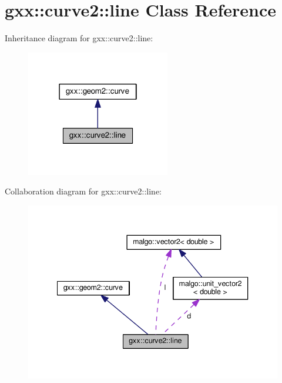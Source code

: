 \hypertarget{classgxx_1_1curve2_1_1line}{}\section{gxx\+:\+:curve2\+:\+:line Class Reference}
\label{classgxx_1_1curve2_1_1line}


Inheritance diagram for gxx\+:\+:curve2\+:\+:line\+:
\nopagebreak
\begin{figure}[H]
\begin{center}
\leavevmode
\includegraphics[width=178pt]{classgxx_1_1curve2_1_1line__inherit__graph}
\end{center}
\end{figure}


Collaboration diagram for gxx\+:\+:curve2\+:\+:line\+:
\nopagebreak
\begin{figure}[H]
\begin{center}
\leavevmode
\includegraphics[width=340pt]{classgxx_1_1curve2_1_1line__coll__graph}
\end{center}
\end{figure}
